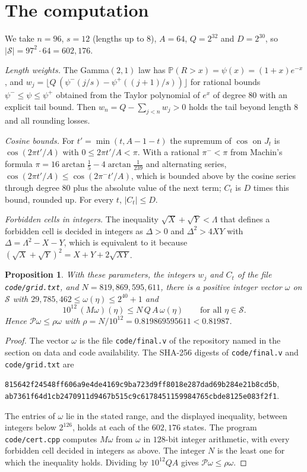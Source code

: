 \documentclass[11pt]{article}
\newtheorem{proposition}[theorem]{Proposition}
\theoremstyle{remark}
\newcommand{\Prob}{\mathbb{P}}
\begin{document}
\section{The computation}\label{sec:computation}

We take $n=96$, $s=12$ (lengths up to $8$), $A=64$, $Q=2^{32}$ and $D=2^{30}$, so $|\mathcal S|=97^2\cdot 64=602{,}176$.

\emph{Length weights.} The Gamma$(2,1)$ law has $\Prob(R>x)=\psi(x)=(1+x)e^{-x}$, and
$w_j=\lfloor Q\,(\psi^-(j/s)-\psi^+((j+1)/s))\rfloor$ for rational bounds $\psi^-\le \psi\le \psi^+$ obtained from the Taylor
polynomial of $e^x$ of degree $80$ with an explicit tail bound. Then $w_n=Q-\sum_{j<n}w_j>0$ holds the tail beyond
length $8$ and all rounding losses.

\emph{Cosine bounds.} For $t'=\min(t,A-1-t)$ the supremum of $\cos$ on $J_t$ is $\cos(2\pi t'/A)$ with
$0\le 2\pi t'/A<\pi$. With a rational $\pi^-<\pi$ from Machin's formula $\pi=16\arctan\frac15-4\arctan\frac1{239}$ and
alternating series, $\cos(2\pi t'/A)\le\cos(2\pi^-t'/A)$, which is bounded above by the cosine series through degree
$80$ plus the absolute value of the next term; $C_t$ is $D$ times this bound, rounded up. For every $t$, $|C_t|\le D$.

\emph{Forbidden cells in integers.} The inequality $\sqrt X+\sqrt Y<\Lambda$ that defines a forbidden cell is decided
in integers as $\Delta>0$ and $\Delta^2>4XY$ with $\Delta=\Lambda^2-X-Y$, which is equivalent to it because
$(\sqrt X+\sqrt Y)^2=X+Y+2\sqrt{XY}$.

\begin{proposition}\label{prop:cert}
With these parameters, the integers $w_j$ and $C_t$ of the file \texttt{code/grid.txt}, and
$N=819{,}869{,}595{,}611$, there is a positive integer vector $\omega$ on $\mathcal S$ with
$29{,}785{,}462\le \omega(\eta)\le 2^{40}+1$ and
\[
10^{12}\,(M\omega)(\eta)\le N\,Q\,A\,\omega(\eta)\qquad\text{for all }\eta\in\mathcal S .
\]
Hence $\mathcal P\omega\le\rho \omega$ with $\rho=N/10^{12}=0.819869595611<0.81987$.
\end{proposition}

\begin{proof}
The vector $\omega$ is the file \texttt{code/final.v} of the repository named in the section on data and code
availability. The SHA-256 digests of \texttt{code/final.v} and \texttt{code/grid.txt} are
\begin{center}\small\texttt{815642f24548ff606a9e4de4169c9ba723d9ff8018e287dad69b284e21b8cd5b},\\
\texttt{ab7361f64d1cb2470911d9467b515c9c6178451159984765cbde8125e083f2f1}.\end{center}
\noindent The entries of $\omega$ lie in the stated range, and the displayed inequality, between integers below $2^{126}$,
holds at each of the $602{,}176$ states. The program \texttt{code/cert.cpp} computes $M\omega$ from $\omega$ in $128$-bit
integer arithmetic, with every forbidden cell decided in integers as above. The integer $N$ is the least one for
which the inequality holds. Dividing by $10^{12}QA$ gives $\mathcal P\omega\le\rho \omega$.
\end{proof}
\end{document}
